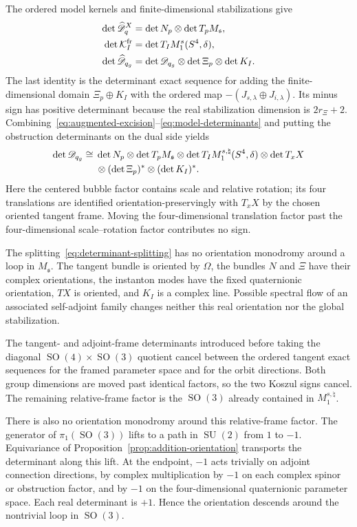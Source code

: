 \documentclass[11pt]{amsart}
\theoremstyle{definition}
\theoremstyle{remark}
\theoremstyle{plain}
\newcommand{\cK}{\mathcal{K}}
\newcommand{\SO}{\operatorname{SO}}
\newcommand{\SU}{\operatorname{SU}}
\begin{document}
The ordered model kernels and finite-dimensional stabilizations give
\begin{align}\label{eq:model-determinants}
 \det\widehat{\mathscr D}^{X}_q
 &=\det N_p\otimes\det T_pM_{\mathfrak s},\notag\\
 \det\cK_I^{\rm fr}
 &=\det T_IM_1^s(S^4,\delta),\\
 \det\widehat{\mathscr D}_{q_g}
 &=\det\mathscr D_{q_g}\otimes\det\Xi_p\otimes\det K_I.
 \notag
\end{align}
The last identity is the determinant exact sequence for adding the
finite-dimensional domain $\Xi_p\oplus K_I$ with the ordered map
$-(J_{s,\lambda}\oplus J_{i,\lambda})$.  Its minus sign has positive
determinant because the real stabilization dimension is $2r_\Xi+2$.
Combining~\eqref{eq:augmented-excision}--\eqref{eq:model-determinants} and
putting the obstruction determinants on the dual side yields
\begin{align}\label{eq:determinant-splitting}
 \det\mathscr D_{q_g}\cong{}&
 \det N_p\otimes\det T_pM_{\mathfrak s}
 \otimes\det T_I M_1^{s,\natural}(S^4,\delta)
 \otimes\det T_xX\notag\\
 &\otimes(\det\Xi_p)^*\otimes(\det K_I)^*.
\end{align}
Here the centered bubble factor contains scale and relative rotation; its
four translations are identified orientation-preservingly with $T_xX$ by
the chosen oriented tangent frame.  Moving the four-dimensional translation
factor past the four-dimensional scale--rotation factor contributes no sign.

The splitting~\eqref{eq:determinant-splitting} has no orientation monodromy
around a loop in $M_{\mathfrak s}$.  The tangent bundle is oriented by
$\Omega$, the bundles $N$ and $\Xi$ have their complex orientations, the
instanton modes have the fixed quaternionic orientation, $TX$ is oriented,
and $K_I$ is a complex line.  Possible spectral flow of an associated
self-adjoint family changes neither this real orientation nor the global
stabilization.

The tangent- and adjoint-frame determinants introduced before taking the
diagonal $\SO(4)\times\SO(3)$ quotient cancel between the ordered tangent
exact sequences for the framed parameter space and for the orbit directions.
Both group dimensions are moved past identical factors, so the two Koszul
signs cancel.  The remaining relative-frame factor is the $\SO(3)$ already
contained in $M_1^{s,\natural}$.

There is also no orientation monodromy around this relative-frame factor.
The generator of $\pi_1(\SO(3))$ lifts to a path in $\SU(2)$ from $1$ to
$-1$.  Equivariance of Proposition~\ref{prop:addition-orientation} transports the determinant
along this lift.  At the endpoint, $-1$ acts trivially on adjoint connection
directions, by complex multiplication by $-1$ on each complex spinor or
obstruction factor, and by $-1$ on the four-dimensional quaternionic
parameter space.  Each real determinant is $+1$.  Hence the
orientation descends around the nontrivial loop in $\SO(3)$.
\end{document}
